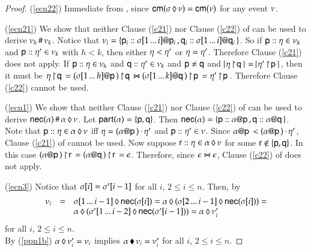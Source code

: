   \begin{proof}
  (\ref{ecn22}) 
 Immediate  from ,  since
$\comm{\pre{\netev}{\sigma}}=\comm{\netev}$ for any event $\netev$. 

(\ref{ecn21}) We show that neither Clause (\ref{c21}) nor
Clause (\ref{c22}) of  can be used to
derive $\netev_h\grr\netev_k$.  Notice that $\netev_i=
\set{\locev{\pp_i}{\projS{{\range\comseq1{i}}}{\pp_i}},
  \locev{\q_i}{\projS{{\range\comseq1{i}}}{\q_i}}}$. So if
$\locev{\pp}\procev\in{\netev_h}$ and
$\locev{\pp}{\procev'}\in{\netev_k}$  with $h<k$,  then
 either  $\procev < \procev'$  or $\procev =
\procev'$. 
Therefore Clause (\ref{c21}) 
does not apply.  If
$\locev{\pp}{\procev}\in{\netev_h}$ and $\locev{\q}{\procev'}\in{\netev_k}$ and 
  $\pp \neq \q$ and $\cardin{\proj\procev\q} =
  \cardin{\proj{\procev'}\pp}$,
  then it must be
  $\dualev{\proj\procev\q =
    \proj{(\projS{\range\comseq1{h}}{\pp})}{\q}}
{\proj{(\projS{\range\comseq1{k}}{\q})}{\pp}
= \proj{\procev'}\pp}$.  Therefore Clause (\ref{c22}) 
cannot be used.

     (\ref{ecn1}) We show that neither Clause (\ref{c21}) nor
    Clause (\ref{c22}) of  can be used to
    derive $\nec\alpha\grr\pre\netev\alpha$.  Let
    $\participant{\alpha} = \set{\pp, \q}$. Then $\nec{\alpha}
    =\set{\locev{\pp}{\projS{\alpha}{\pp}},
      \locev{\q}{\projS{\alpha}{\q}}}$. Note that
    $\locev{\pp}{\procev}\in \pre{\netev}{\alpha}$ iff $\procev =
    \concat{(\projS{\alpha}{\pp})}{\procev'}$ and
    $\locev{\pp}{\procev'}\in \netev$. Since $\projS{\alpha}{\pp} <
    \concat{(\projS{\alpha}{\pp})}{\procev'}$, Clause (\ref{c21})
    of 
    cannot be used. Now suppose $\locev{\pr}{\procev}\in
    \pre{\netev}{\alpha}$ for some $\pr \notin \set{\pp, \q}$.  In
    this case $\proj{(\projS{\alpha}{\pp})}{\pr} =
    \proj{(\projS{\alpha}{\q})}{\pr} = \ee$. Therefore,  since
    $\dualev{\ee}{\ee}$, Clause
    (\ref{c22}) of  does not
    apply.  
  

 

(\ref{ecn3}) Notice that $\at{\comseq}{i}=\at{\comseq'}{i-1}$ for all
$i$, $2\leq i\leq n$. Then,
by 
\[
\begin{array}{lll}\netev_i &=&\pre{\nec{\at{\comseq}{i}}}{\range\comseq1{i-1}}=
\pre{(\pre{\nec{\at{\comseq}{i}}}{\range\comseq2{i-1}})}\alpha=\\
&&\pre{(\pre{\nec{\at{\comseq'}{i-1}}}{\range{\comseq'}1{i-2}})}\alpha=\pre{\netev'_i}\alpha
\end{array}
\]
for all $i$, $2\leq i\leq n$.
\\
By
(\ref{ppn1b})
$\pre{\netev'_i}\alpha=\netev_i$ implies
$\post{\netev_i}\alpha=\netev_i'$ for all $i$, $2\leq i\leq n$.
  \end{proof}
  
